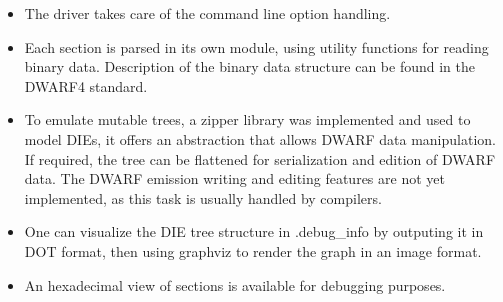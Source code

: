 \begin{itemize}
    \item The driver takes care of the command line option handling.
    \item Each section is parsed in its own module, using utility functions for reading binary data.
        Description of the binary data structure can be found in the DWARF4
        standard\autocite{dwarf4}.
    \item To emulate mutable trees, a zipper library was implemented and used to model
        DIEs, it offers an abstraction that allows DWARF data manipulation.
        If required, the tree can be flattened for serialization and edition of DWARF
        data.
        The DWARF emission writing and editing features are not yet implemented, as
        this task is usually handled by compilers.
    \item One can visualize the DIE tree structure in .debug\_info by outputing it in DOT
        format, then using graphviz to render the graph in an image format.
    \item An hexadecimal view of sections is available for debugging purposes.
\end{itemize}







